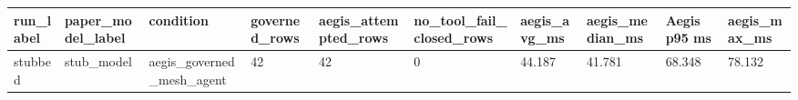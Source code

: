 \begin{tabular}{llllllllll}
 \hline
run\_label & paper\_model\_label & condition & governed\_rows & aegis\_attempted\_rows & no\_tool\_fail\_closed\_rows & aegis\_avg\_ms & aegis\_median\_ms & Aegis p95 ms & aegis\_max\_ms \\
 \hline
stubbed & stub\_model & aegis\_governed\_mesh\_agent & 42 & 42 & 0 & 44.187 & 41.781 & 68.348 & 78.132 \\
 \hline
\end{tabular}
